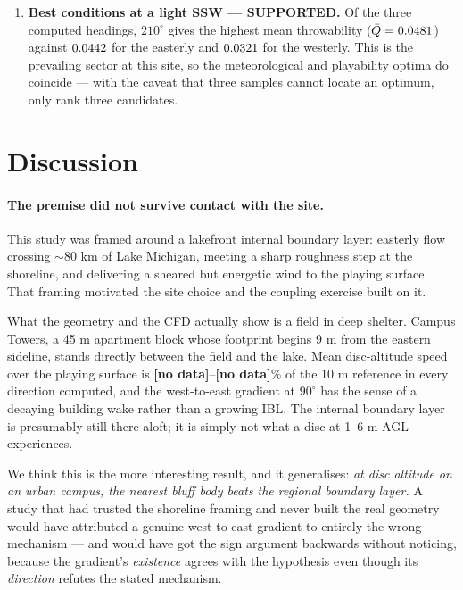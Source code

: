 \documentclass[11pt,letterpaper]{article}
\newcommand{\MISSINGNUM}{\textbf{\color{red}[no data]}}%
\newcommand{\UfieldFracMin}{\MISSINGNUM}\newcommand{\UfieldFracMax}{\MISSINGNUM}%
\begin{document}
\begin{enumerate}[leftmargin=*,itemsep=4pt]
  \item \textbf{Best conditions at a light SSW --- SUPPORTED.} Of the three
    computed headings, $210^\circ$ gives the highest mean throwability
    ($\bar Q = 0.0481$) against $0.0442$ for the easterly
    and $0.0321$ for the westerly. This is the prevailing sector at
    this site, so the meteorological and playability optima do coincide --- with
    the caveat that three samples cannot locate an optimum, only rank three
    candidates.
\end{enumerate}

\section{Discussion}
\label{sec:discussion}

\paragraph{The premise did not survive contact with the site.} This study was
framed around a lakefront internal boundary layer: easterly flow crossing
$\sim$80 km of Lake Michigan, meeting a sharp roughness step at the shoreline,
and delivering a sheared but energetic wind to the playing surface. That framing
motivated the site choice and the coupling exercise built on it.

What the geometry and the CFD actually show is a field in deep shelter. Campus
Towers, a 45 m apartment block whose footprint begins 9 m from the eastern
sideline, stands directly between the field and the lake. Mean disc-altitude
speed over the playing surface is \UfieldFracMin--\UfieldFracMax\% of the 10 m
reference in every direction computed, and the west-to-east gradient at $90^\circ$ has the sense of
a decaying building wake rather than a growing IBL. The internal boundary layer
is presumably still there aloft; it is simply not what a disc at 1--6 m AGL
experiences.

We think this is the more interesting result, and it generalises: \emph{at disc
altitude on an urban campus, the nearest bluff body beats the regional boundary
layer.} A study that had trusted the shoreline framing and never built the real
geometry would have attributed a genuine west-to-east gradient to entirely the
wrong mechanism --- and would have got the sign argument backwards without
noticing, because the gradient's \emph{existence} agrees with the hypothesis
even though its \emph{direction} refutes the stated mechanism.
\end{document}
